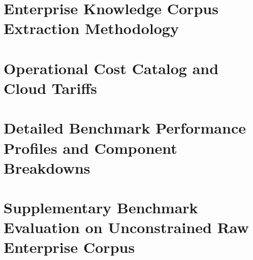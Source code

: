 \clearpage



\clearpage
\thesisappendix

\section{Enterprise Knowledge Corpus Extraction Methodology}
\label{sec:appendix}
\label{sec:appendix_a}


\clearpage

\section{Operational Cost Catalog and Cloud Tariffs}
\label{sec:appendix_pricing}
\label{sec:appendix_b}


\clearpage

\section{Detailed Benchmark Performance Profiles and Component Breakdowns}
\label{sec:appendix_breakdowns}
\label{sec:appendix_c}


\clearpage

\section{Supplementary Benchmark Evaluation on Unconstrained Raw Enterprise Corpus}
\label{sec:appendix_raw_data}
\label{sec:appendix_d}


